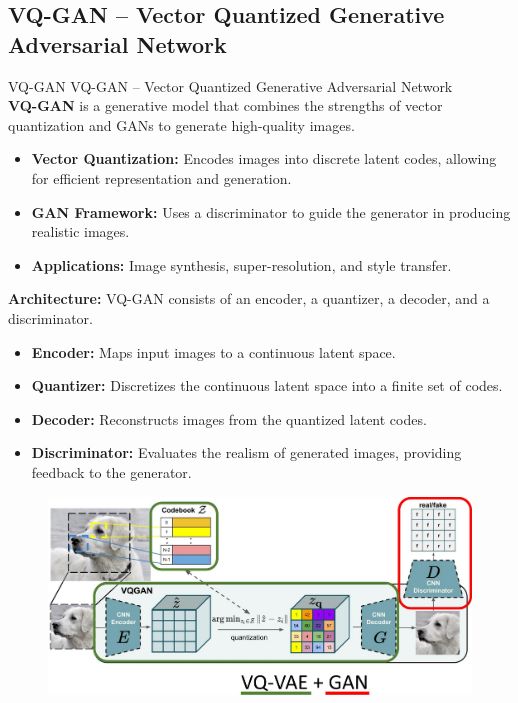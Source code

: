 \subsection{VQ-GAN – Vector Quantized Generative Adversarial Network}
\begin{frame}[allowframebreaks]{VQ-GAN}
    \large VQ-GAN – Vector Quantized Generative Adversarial Network \\[1em]
    \textbf{VQ-GAN} is a generative model that combines the strengths of vector quantization and GANs to generate high-quality images.

    \begin{itemize}
        \item \textbf{Vector Quantization:} Encodes images into discrete latent codes, allowing for efficient representation and generation.
        \item \textbf{GAN Framework:} Uses a discriminator to guide the generator in producing realistic images.
        \item \textbf{Applications:} Image synthesis, super-resolution, and style transfer.
    \end{itemize}
\framebreak
    \textbf{Architecture:} VQ-GAN consists of an encoder, a quantizer, a decoder, and a discriminator.
    \begin{itemize}
        \item \textbf{Encoder:} Maps input images to a continuous latent space.
        \item \textbf{Quantizer:} Discretizes the continuous latent space into a finite set of codes.
        \item \textbf{Decoder:} Reconstructs images from the quantized latent codes.
        \item \textbf{Discriminator:} Evaluates the realism of generated images, providing feedback to the generator.
    \end{itemize}
\framebreak
    \begin{figure}
        \centering
        \includegraphics[width=1\textwidth,height=0.9\textheight,keepaspectratio]{images/video/slide_59_1_img.jpg}
    \end{figure}
\end{frame}
